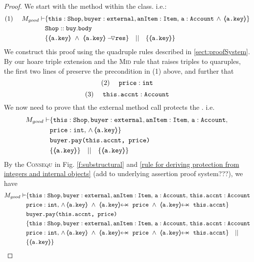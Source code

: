 \begin{proof}
We start with the  method within the  class. i.e.:
\small
\begin{align*}
\text{(1)}  \ \ \ \ M_{good} \vdash 
		&	\{  \prg{this}:\prg{Shop}, \prg{buyer} : \prg{external}, \prg{anItem} : \prg{Item},\, \prg{a}:\prg{Account}\,\wedge\, 
				{\inside{\prg{a.key}}} \} \\
		& \prg{Shop}::\prg{buy}.\prg{body}\ \\  
		& \{ {\inside{\prg{a.key}}}\ \wedge\ {\PushASLong {\prg{res}} {\inside{\prg{a.key}}}}  \} \ \ \  || \ \ \ 
		   \{ {\inside{\prg{a.key}}} \}
\end{align*}
\normalsize
We construct this proof using the quadruple rules described in \ref{sect:proofSystem}. By our hoare triple extension and the \textsc{Mid} rule that raises triples to quaruples, the first two lines
of \prg{buy} preserve the precondition in (1) above, and further that 
\small
$$
\text{(2)} \ \ \ \ \mbox{\normalfont{\texttt{price}}} : \mbox{\normalfont{\texttt{int}}}
$$ 
$$
\text{(3)} \ \ \ \ \prg{this.accnt} : \prg{Account}
$$ 
We now need to prove that the external method call  protects the . i.e.
\small
\begin{align*}
M_{good} \vdash & \{  \prg{this}:\prg{Shop}, \prg{buyer} : \prg{external}, \prg{anItem} : \prg{Item},\, \prg{a}:\prg{Account},\, \\
				& \prg{price} : \prg{int},\,
				  \wedge\, 
				  {\inside{\prg{a.key}}} \} \\
		  		& \prg{buyer.pay(this.accnt, price)}\ \\  
		  		& \{ {\inside{\prg{a.key}}}  \} \ \ \  || \ \ \ 
		  		   \{ {\inside{\prg{a.key}}} \}
\end{align*}
\normalsize
By the \textsc{Consequ} in Fig. \ref{f:substructural} and \ref{rule for deriving protection from integers and internal objects} (add to underlying assertion proof system???), we have
\small
\begin{align*}
M_{good} \vdash & \{  \prg{this}:\prg{Shop}, \prg{buyer} : \prg{external}, \prg{anItem} : \prg{Item},\, \prg{a}:\prg{Account},\, \prg{this.accnt}:\prg{Account}\\
				& \prg{price} : \prg{int},\,
				  \wedge\, 
				  {\inside{\prg{a.key}}}\ \wedge\ 
				  \protectedFrom{\prg{a.key}}{\prg{price}}\ \wedge\ 
				   \protectedFrom{\prg{a.key}}{\prg{this.accnt}}\} \\
		  		& \prg{buyer.pay(this.accnt, price)}\ \\  
		  		& \{  \prg{this}:\prg{Shop}, \prg{buyer} : \prg{external}, \prg{anItem} : \prg{Item},\, \prg{a}:\prg{Account},\, \prg{this.accnt}:\prg{Account}\\
				& \prg{price} : \prg{int},\,
				  \wedge\, 
				  {\inside{\prg{a.key}}}\ \wedge\ 
				  \protectedFrom{\prg{a.key}}{\prg{price}}\ \wedge\ 
				   \protectedFrom{\prg{a.key}}{\prg{this.accnt}}\} \ \ \  || \ \ \ \\
		  		& \{ {\inside{\prg{a.key}}} \}
\end{align*}
\normalsize


\end{proof}

